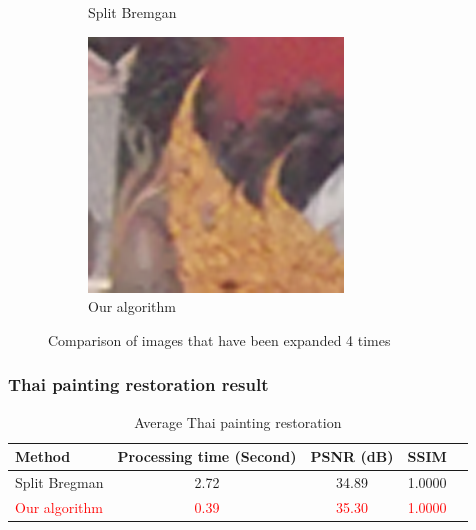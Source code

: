 \documentclass[xcolor=dvipsnames, xetex,serif]{beamer}
\begin{document}
\begin{frame}
\begin{figure}[H]
\begin{subfigure}{0.4\linewidth}
                \caption{Split Bremgan}
            \end{subfigure}
            \begin{subfigure}{0.4\linewidth}
                \centering
                \includegraphics[width=0.6\linewidth]{images/result_ex4_scaleup/multisplitbregman.png}	
                \caption{Our algorithm}
            \end{subfigure}
            \caption{Comparison of images that have been expanded 4 times}
        \end{figure}
    \end{frame}
    \begin{frame}
        \frametitle{Thai painting restoration result}
        \begin{table}[H]
            \centering
            \begin{tabular}[ht]{|l|c|c|c|c|}
                \hline
                Method  & Processing time  (Second) & PSNR (dB) & SSIM \\
                \hline
                Split Bregman & 2.72 & 34.89 & 1.0000 \\ 
                \textcolor{red}{Our algorithm} & \textcolor{red}{0.39} & \textcolor{red}{35.30} & \textcolor{red}{1.0000} \\
                \hline
            \end{tabular}
            \caption{Average Thai painting restoration}
        \end{table}	
    \end{frame}
\end{document}
